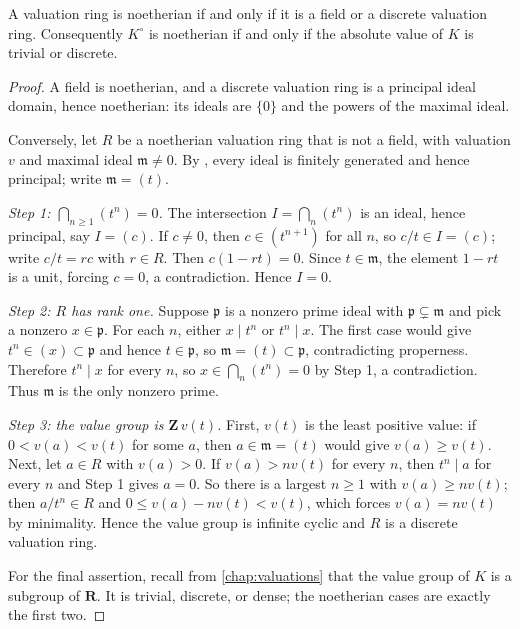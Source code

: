 \begin{proposition}
\label{prop:noetherian-valuation-dvr}
A valuation ring is noetherian if and only if it is a field or a discrete
valuation ring.  Consequently $K^\circ$ is noetherian if and only if the
absolute value of $K$ is trivial or discrete.
\end{proposition}
\begin{proof}
A field is noetherian, and a discrete valuation ring is a principal ideal
domain, hence noetherian: its ideals are $\{0\}$ and the powers of the
maximal ideal.

Conversely, let $R$ be a noetherian valuation ring that is not a field, with
valuation $v$ and maximal ideal $\mathfrak m\ne0$.  By
, every ideal is finitely generated and
hence principal; write $\mathfrak m=(t)$.

\emph{Step 1: $\bigcap_{n\geq1}(t^n)=0$.}  The intersection
$I=\bigcap_n(t^n)$ is an ideal, hence principal, say $I=(c)$.  If $c\ne0$,
then $c\in(t^{n+1})$ for all $n$, so $c/t\in I=(c)$; write $c/t=rc$ with
$r\in R$.  Then $c(1-rt)=0$.  Since $t\in\mathfrak m$, the element $1-rt$ is
a unit, forcing $c=0$, a contradiction.  Hence $I=0$.

\emph{Step 2: $R$ has rank one.}  Suppose $\mathfrak p$ is a nonzero prime
ideal with $\mathfrak p\subsetneq\mathfrak m$ and pick a nonzero
$x\in\mathfrak p$.  For each $n$, either $x\mid t^n$ or $t^n\mid x$.  The
first case would give $t^n\in(x)\subset\mathfrak p$ and hence
$t\in\mathfrak p$, so $\mathfrak m=(t)\subset\mathfrak p$, contradicting
properness.  Therefore $t^n\mid x$ for every $n$, so
$x\in\bigcap_n(t^n)=0$ by Step 1, a contradiction.  Thus $\mathfrak m$ is
the only nonzero prime.

\emph{Step 3: the value group is $\mathbf Z\,v(t)$.}  First, $v(t)$ is the
least positive value: if $0<v(a)<v(t)$ for some $a$, then
$a\in\mathfrak m=(t)$ would give $v(a)\geq v(t)$.  Next, let $a\in R$ with
$v(a)>0$.  If $v(a)>nv(t)$ for every $n$, then $t^n\mid a$ for every $n$
and Step 1 gives $a=0$.  So there is a largest $n\geq1$ with
$v(a)\geq nv(t)$; then $a/t^n\in R$ and
$0\leq v(a)-nv(t)<v(t)$, which forces $v(a)=nv(t)$ by minimality.  Hence
the value group is infinite cyclic and $R$ is a discrete valuation ring.

For the final assertion, recall from \cref{chap:valuations} that the value
group of $K$ is a subgroup of $\mathbf R$.  It is trivial, discrete, or
dense; the noetherian cases are exactly the first two.
\end{proof}

